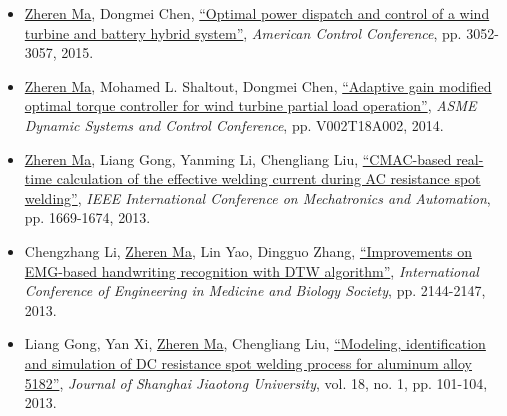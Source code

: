 \documentclass[margin, 9pt]{res} %
\begin{document}
\begin{resume}
\begin{itemize}[leftmargin=*]
	\item \underline{Zheren Ma},  Dongmei Chen,
          \href{http://ieeexplore.ieee.org/xpl/login.jsp?tp=&arnumber=7171801&url=http\%3A\%2F\%2Fieeexplore.ieee.org\%2Fxpls\%2Fabs_all.jsp\%3Farnumber\%3D7171801}
          {``Optimal power dispatch and control of a wind turbine and battery hybrid system''},
          \textit{American Control Conference}, pp. 3052-3057, 2015.

	\item \underline{Zheren Ma}, Mohamed L. Shaltout, Dongmei Chen,
          \href{http://proceedings.asmedigitalcollection.asme.org/proceeding.aspx?articleid=2086149}
          {``Adaptive gain modified optimal torque controller for wind turbine partial load operation''},
          \textit{ASME Dynamic Systems and Control Conference}, pp. V002T18A002, 2014.

	\item \underline{Zheren Ma}, Liang Gong, Yanming Li, Chengliang Liu,
          \href{http://ieeexplore.ieee.org/xpl/login.jsp?tp=&arnumber=6618166&url=http\%3A\%2F\%2Fieeexplore.ieee.org\%2Fxpls\%2Fabs_all.jsp\%3Farnumber\%3D6618166}
          {``CMAC-based real-time calculation of the effective welding current during AC resistance spot welding''},
          \textit{IEEE International Conference on Mechatronics and Automation}, pp. 1669-1674, 2013.

    \item Chengzhang Li, \underline{Zheren Ma}, Lin Yao, Dingguo Zhang,
          \href{http://ieeexplore.ieee.org/xpl/login.jsp?tp=&arnumber=6609958&url=http\%3A\%2F\%2Fieeexplore.ieee.org\%2Fiel7\%2F6596169\%2F6609410\%2F06609958.pdf\%3Farnumber\%3D6609958}
          {``Improvements on EMG-based handwriting recognition with DTW algorithm''},
          \textit{ International Conference of Engineering in Medicine and Biology Society}, pp. 2144-2147, 2013.
          
    \item Liang Gong, Yan Xi, \underline{Zheren Ma}, Chengliang Liu,
          \href{http://link.springer.com/article/10.1007\%2Fs12204-013-1371-8}
          {``Modeling, identification and simulation of DC resistance spot welding process for aluminum alloy 5182''},
          \textit{Journal of Shanghai Jiaotong University}, vol. 18, no. 1, pp. 101-104, 2013.
\end{itemize}



\end{resume}
\end{document}
